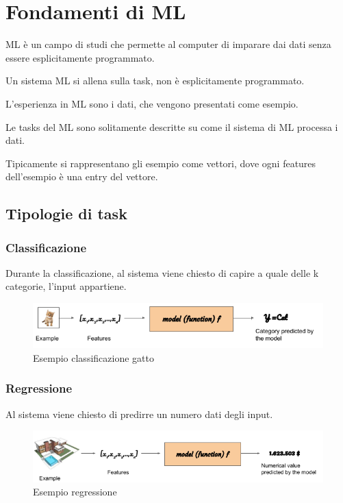\section{Fondamenti di ML}

ML è un campo di studi che permette al computer di imparare dai dati senza essere esplicitamente programmato.

Un sistema ML si allena sulla task, non è esplicitamente programmato.

L'esperienza in ML sono i dati, che vengono presentati come esempio.

Le tasks del ML sono solitamente descritte su come il sistema di ML processa i dati.

Tipicamente si rappresentano gli esempio come vettori, dove ogni features dell'esempio è una entry del vettore.

\subsection{Tipologie di task}
\subsubsection{Classificazione}
Durante la classificazione, al sistema viene chiesto di capire a quale delle k categorie, l'input appartiene.


\begin{figure}[h!]
    \centering
    \includegraphics[width=0.6\linewidth]{imgs/15---classificazione-gatto}
    \caption{Esempio classificazione gatto}
    \label{fig:classificazione_gatto}
\end{figure}


\subsubsection{Regressione}
Al sistema viene chiesto di predirre un numero dati degli input.


\begin{figure}[H]
    \centering
    \includegraphics[width=0.6\linewidth]{imgs/16---regression}
    \caption{Esempio regressione}
    \label{fig:regressione}
\end{figure}


